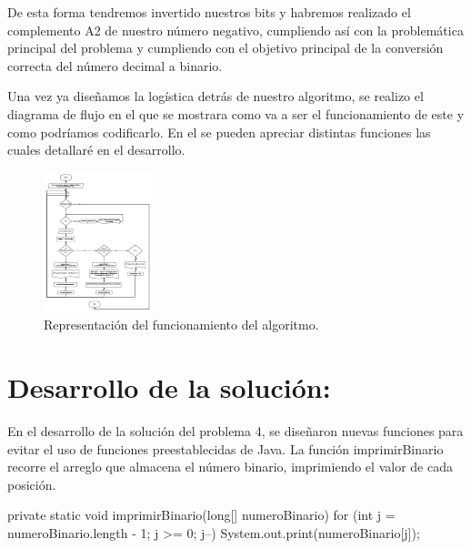 \documentclass{IEEEcsmag}
\begin{document}
De esta forma tendremos invertido nuestros bits y habremos realizado el complemento A2 de nuestro número negativo, cumpliendo así con la problemática principal del problema y cumpliendo con el objetivo principal de la conversión correcta del número decimal a binario.

Una vez ya diseñamos la logística detrás de nuestro algoritmo, se realizo el diagrama de flujo en el que se mostrara como va a ser el funcionamiento de este y como podríamos codificarlo. En el se pueden apreciar distintas funciones las cuales detallaré en el desarrollo.

\begin{figure}[h!]
    \centering
    \includegraphics[width=0.6\linewidth]{./latex-imagenes/DiagramaFlujo4.png}
    \caption{Representación del funcionamiento del algoritmo.}
    \label{fig: Diagrama de flujo.}
\end{figure}

\section*{Desarrollo de la solución:}

En el desarrollo de la solución del problema 4, se diseñaron nuevas funciones para evitar el uso de funciones preestablecidas de Java. La función imprimirBinario recorre el arreglo que almacena el número binario, imprimiendo el valor de cada posición.

\begin{javaCode}
	private static void imprimirBinario(long[] numeroBinario) {
		for (int j = numeroBinario.length - 1; j >= 0; j--) {
			System.out.print(numeroBinario[j]);
		}
	}
\end{javaCode}
\end{document}
